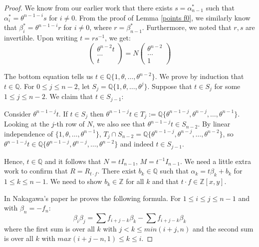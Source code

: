 \documentclass{report}
\begin{document}
\begin{proof}
We know from our earlier work that there exists $s = \alpha_{n-1}^*$ such that $\alpha_i^* = \theta^{n-1-i} s$ for $i \neq 0$.  From the proof of Lemma \ref{points f0}, we similarly know that $\beta_i^* = \theta^{n-1-i} r$ for $i \neq 0$, where $r = \beta_{n-1}^*$.  Furthermore, we noted that $r,s$ are invertible.  Upon writing $t = rs^{-1}$, we get:
\begin{equation}
\begin{pmatrix} \theta^{n-2} t \\ \ldots \\ t \end{pmatrix} = N \begin{pmatrix} \theta^{n-2} \\ \ldots \\ 1 \end{pmatrix}
\end{equation}

The bottom equation tells us $t \in \mathbb{Q}\{1, \theta, \ldots, \theta^{n-2} \}$.  We prove by induction that $t \in \mathbb{Q}$.  For $0 \leq j \leq n-2$, let $S_j = \mathbb{Q}\{1, \theta, \ldots, \theta^j \}$.  Suppose that $t \in S_j$ for some $1 \leq j \leq n-2$.  We claim that $t \in S_{j-1}$:

Consider $\theta^{n-1-j} t$.  If $t \in S_j$ then $\theta^{n-1-j} t \in T_j := \mathbb{Q}\{\theta^{n-1-j}, \theta^{n-j}, \ldots, \theta^{n-1} \}$.  Looking at the $j$-th row of $N$, we also see that $\theta^{n-1-j} t \in S_{n-2}$.  By linear independence of $\{1, \theta, \ldots, \theta^{n-1} \}$, $T_j \cap S_{n-2} = \mathbb{Q} \{\theta^{n-1-j}, \theta^{n-j}, \ldots, \theta^{n-2} \}$, so $\theta^{n-1-j} t \in \mathbb{Q}\{\theta^{n-1-j}, \theta^{n-j}, \ldots, \theta^{n-2} \}$ and indeed $t \in S_{j-1}$.

Hence, $t \in \mathbb{Q}$ and it follows that $N = t I_{n-1}$, $M = t^{-1} I_{n-1}$.  We need a little extra work to confirm that $R = R_{t \cdot f}$.  There exist $b_k \in \mathbb{Q}$ such that $\alpha_k = t \beta_k + b_k$ for $1 \leq k \leq n-1$.  We need to show $b_k \in \mathbb{Z}$ for all $k$ and that $t \cdot f \in \mathbb{Z}[x,y]$.

In Nakagawa's paper he proves the following formula.  For $1 \leq i \leq j \leq n-1$ and with $\beta_n = -f_n$:
\begin{equation}
\beta_i \beta_j = \sum f_{i+j-k} \beta_k - \sum f_{i+j-k} \beta_k
\end{equation}
where the first sum is over all $k$ with $j < k \leq min(i+j,n)$ and the second sum is over all $k$ with $max(i+j-n,1) \leq k \leq i$.


\end{proof}
\end{document}
